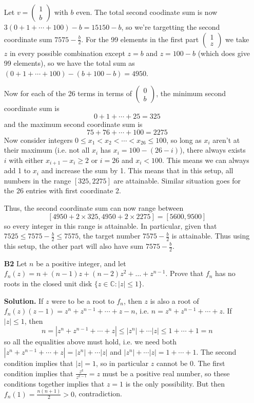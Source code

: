 \documentclass[11pt,a4paper]{article}
\newcommand{\<}{\langle}
\renewcommand{\>}{\rangle}
\begin{document}
\begin{enumerate}
	Let $v=\begin{pmatrix}1\\b\end{pmatrix}$ with $b$ even. The total second coodinate sum is now $3(0+1+\cdots+100)-b=15150-b$, so we're targetting the second coordinate sum $7575-\frac b2$. 
	For the 99 elements in the first part $\begin{pmatrix}1 \\ z\end{pmatrix}$ we take $z$ in every possible combination except $z=b$ and $z=100-b$ (which does give 99 elements), so we have the total sum as $(0+1+\cdots+100)-(b+100-b)=4950$. 
	
	Now for each of the 26 terms in terms of $\begin{pmatrix}0\\b\end{pmatrix}$, the minimum second coordinate sum is 
	\[
	0+1+\cdots + 25 = 325
	\]
	and the maximum second coordinate sum is 
	\[
	75+76+\cdots + 100 = 2275
	\]
	Now consider integers $0\le x_1<x_2<\cdots < x_{26}\le 100$, so long as $x_i$ aren't at their maximum (i.e. not all $x_i$ has $x_i=100-(26-i)$), there always exists $i$ with either $x_{i+1}-x_i\ge 2$ or $i=26$ and $x_i<100$. This means we can always add 1 to $x_i$ and increase the sum by 1. This means that in this setup, all numbers in the range $[325, 2275]$ are attainable. Similar situation goes for the 26 entries with first coordinate 2. 
	
	Thus, the second coordinate sum can now range between 
	\[
	[4950+2\times 325, 4950+2\times 2275] = [5600, 9500]
	\]
	so every integer in this range is attainable. In particular, given that $7525\le 7575-\frac b2 \le 7575$, the target number $7575-\frac b2$ is attainable. Thus using this setup, the other part will also have sum $7575-\frac b2$. 
	
	\item [\textbf{B2}]
	Let $n$ be a positive integer, and let $f_n(z) = n + (n-1)z + (n-2)z^2 + \dots + z^{n-1}$. Prove that $f_n$ has no roots in the closed unit disk $\{z \in \mathbb{C}: |z| \le 1\}$.
	
	\textbf{Solution.} 
	If $z$ were to be a root to $f_n$, then $z$ is also a root of 
	$f_n(z)(z-1)=z^n+z^{n-1}+\cdots + z - n$, i.e. 
	$n=z^n+z^{n-1}+\cdots + z$. 
	If $|z|\le 1$, then 
	\[n=|z^n+z^{n-1}+\cdots + z|
	\le |z^n|+\cdots |z|
	\le 1+\cdots + 1
	=n
	\]
	so all the equalities above must hold, i.e. we need both $|z^n+z^{n-1}+\cdots + z| = |z^n|+\cdots |z|$ and 
	$|z^n|+\cdots |z|=1+\cdots +1$. The second condition implies that $|z|=1$, so in particular $z$ cannot be 0. 
	The first condition implies that $\frac{z^k}{z^{k-1}}=z$ must be a positive real number, so these conditions together implies that $z=1$ is the only possibility. 
	But then $f_n(1)=\frac{n(n+1)}{2}>0$, contradiction. 
	

\end{enumerate}
\end{document}
